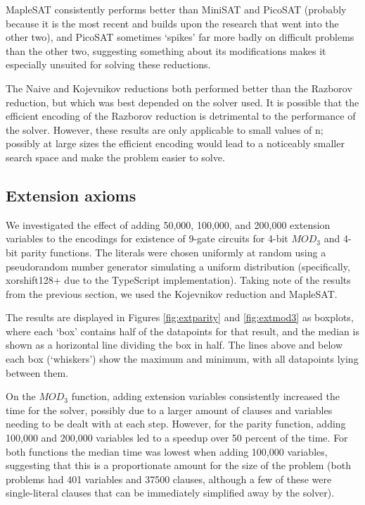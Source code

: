 \documentclass{article}
\begin{document}
MapleSAT consistently performs better than MiniSAT and PicoSAT (probably because it is the most recent and builds upon the research that went into the other two), and PicoSAT sometimes `spikes' far more badly on difficult problems than the other two, suggesting something about its modifications makes it especially unsuited for solving these reductions.

The Naive and Kojevnikov reductions both performed better than the Razborov reduction, but which was best depended on the solver used. It is possible that the efficient encoding of the Razborov reduction is detrimental to the performance of the solver. However, these results are only applicable to small values of n; possibly at large sizes the efficient encoding would lead to a noticeably smaller search space and make the problem easier to solve.

\subsection{Extension axioms}\label{extresults}

We investigated the effect of adding 50,000, 100,000, and 200,000 extension variables to the encodings for existence of 9-gate circuits for 4-bit \(MOD_3\) and 4-bit parity functions. The literals were chosen uniformly at random using a pseudorandom number generator simulating a uniform distribution (specifically, xorshift128+ due to the TypeScript implementation). Taking note of the results from the previous section, we used the Kojevnikov reduction and MapleSAT.

The results are displayed in Figures \ref{fig:extparity} and \ref{fig:extmod3} as boxplots, where each `box' contains half of the datapoints for that result, and the median is shown as a horizontal line dividing the box in half. The lines above and below each box (`whiskers') show the maximum and minimum, with all datapoints lying between them.

On the \(MOD_3\) function, adding extension variables consistently increased the time for the solver, possibly due to a larger amount of clauses and variables needing to be dealt with at each step. However, for the parity function, adding 100,000 and 200,000 variables led to a speedup over 50 percent of the time. For both functions the median time was lowest when adding 100,000 variables, suggesting that this is a proportionate amount for the size of the problem (both problems had 401 variables and 37500 clauses, although a few of these were single-literal clauses that can be immediately simplified away by the solver).
\end{document}
